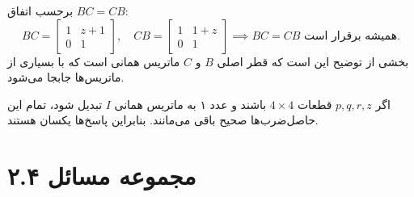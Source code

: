 \documentclass[12pt, a4paper]{book}
\begin{document}
	برحسب اتفاق $BC=CB$:
	\[ BC = \begin{bmatrix} 1 & z+1 \\ 0 & 1 \end{bmatrix}, \quad CB = \begin{bmatrix} 1 & 1+z \\ 0 & 1 \end{bmatrix} \implies BC=CB \text{ همیشه برقرار است.} \]
	بخشی از توضیح این است که قطر اصلی $B$ و $C$ ماتریس همانی است که با بسیاری از ماتریس‌ها جابجا می‌شود.
	
	اگر $p,q,r,z$ قطعات $4 \times 4$ باشند و عدد ۱ به ماتریس همانی $I$ تبدیل شود، تمام این حاصل‌ضرب‌ها صحیح باقی می‌مانند. بنابراین پاسخ‌ها یکسان هستند.
	
	\newpage
	\section*{مجموعه مسائل ۲.۴}
\end{document}

